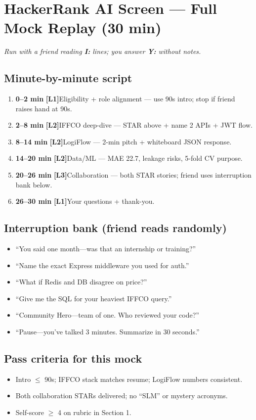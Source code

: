 \documentclass[9pt,a4paper]{article}
\newcommand{\diffLone}{\textcolor{green!50!black}{\textbf{[L1]}}}
\newcommand{\diffLtwo}{\textcolor{orange!90!black}{\textbf{[L2]}}}
\newcommand{\diffLthree}{\textcolor{brutal}{\textbf{[L3]}}}
\begin{document}
\newpage
\section{HackerRank AI Screen --- Full Mock Replay (30 min)}
\textit{Run with a friend reading \textbf{I:} lines; you answer \textbf{Y:} without notes.}

\subsection{Minute-by-minute script}
\begin{enumerate}
  \item \textbf{0--2 min} \diffLone Eligibility + role alignment --- use 90s intro; stop if friend raises hand at 90s.
  \item \textbf{2--8 min} \diffLtwo IFFCO deep-dive --- STAR above + name 2 APIs + JWT flow.
  \item \textbf{8--14 min} \diffLtwo LogiFlow --- 2-min pitch + whiteboard JSON response.
  \item \textbf{14--20 min} \diffLtwo Data/ML --- MAE 22.7, leakage risks, 5-fold CV purpose.
  \item \textbf{20--26 min} \diffLthree Collaboration --- both STAR stories; friend uses interruption bank below.
  \item \textbf{26--30 min} \diffLone Your questions + thank-you.
\end{enumerate}

\subsection{Interruption bank (friend reads randomly)}
\begin{itemize}
  \item ``You said one month---was that an internship or training?''
  \item ``Name the exact Express middleware you used for auth.''
  \item ``What if Redis and DB disagree on price?''
  \item ``Give me the SQL for your heaviest IFFCO query.''
  \item ``Community Hero---team of one. Who reviewed your code?''
  \item ``Pause---you've talked 3 minutes. Summarize in 30 seconds.''
\end{itemize}

\subsection{Pass criteria for this mock}
\begin{itemize}
  \item Intro $\leq$ 90s; IFFCO stack matches resume; LogiFlow numbers consistent.
  \item Both collaboration STARs delivered; no ``SLM'' or mystery acronyms.
  \item Self-score $\geq$ 4 on rubric in Section 1.
\end{itemize}
\end{document}
